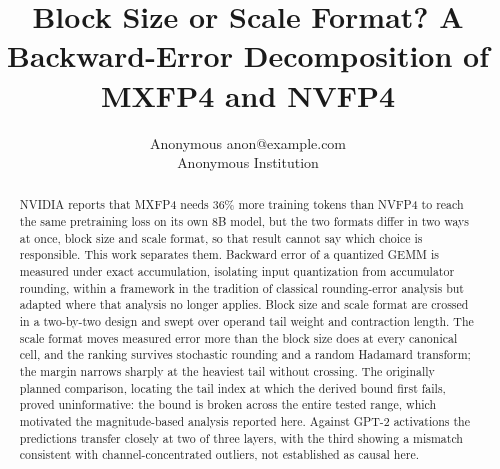 \documentclass[10pt]{article}
\title{Block Size or Scale Format? A Backward-Error Decomposition of
  MXFP4 and NVFP4}
\author{\name Anonymous \email anon@example.com \\
  \addr Anonymous Institution}
\begin{document}
\maketitle

\begin{abstract}
  NVIDIA reports that MXFP4 needs 36\% more training tokens than NVFP4 to reach
  the same pretraining loss on its own 8B model, but the two formats differ in
  two ways at once, block size and scale format, so that result cannot say which
  choice is responsible. This work separates them. Backward error of a quantized
  GEMM is measured under exact accumulation, isolating input quantization from
  accumulator rounding, within a framework in the tradition of classical
  rounding-error analysis but adapted where that analysis no longer applies.
  Block size and
  scale format are crossed in a two-by-two design and swept over operand tail
  weight and contraction length. The scale format moves measured error more than
  the block size does at every canonical cell, and the ranking survives
  stochastic rounding and a random Hadamard transform; the margin narrows sharply
  at the heaviest tail without crossing. The originally planned comparison,
  locating the tail index at which the derived bound first fails, proved
  uninformative: the bound is broken across the entire tested range, which
  motivated the magnitude-based analysis reported here. Against GPT-2 activations
  the predictions transfer closely at two of three layers, with the third showing a
  mismatch consistent with channel-concentrated outliers, not established as
  causal here.
\end{abstract}











\end{document}
